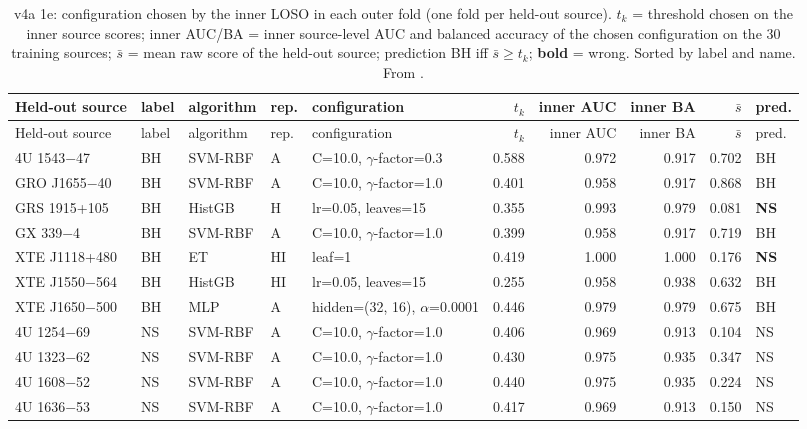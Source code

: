 {\scriptsize\setlength{\tabcolsep}{3pt}
\begin{longtable}{@{}llllp{3.6cm}rrrrl@{}}
\caption[v4a nested selection per fold]{v4a 1e: configuration chosen by the inner LOSO in each outer fold (one fold per
held-out source). $t_k$ = threshold chosen on the inner source scores; inner AUC/BA = inner source-level AUC and balanced
accuracy of the chosen configuration on the 30 training sources; $\bar s$ = mean raw score of the held-out source;
prediction BH iff $\bar s\ge t_k$; \textbf{bold} = wrong. Sorted by label and name. From
.}\label{tab:p2nested}\\
\toprule
Held-out source & label & algorithm & rep. & configuration & $t_k$ & inner AUC & inner BA & $\bar s$ & pred. \\
\midrule\endfirsthead
\toprule Held-out source & label & algorithm & rep. & configuration & $t_k$ & inner AUC & inner BA & $\bar s$ & pred. \\ \midrule\endhead
\bottomrule\endfoot
4U 1543$-$47 & BH & SVM-RBF & A & C=10.0, $\gamma$-factor=0.3 & 0.588 & 0.972 & 0.917 & 0.702 & BH \\
GRO J1655$-$40 & BH & SVM-RBF & A & C=10.0, $\gamma$-factor=1.0 & 0.401 & 0.958 & 0.917 & 0.868 & BH \\
GRS 1915+105 & BH & HistGB & H & lr=0.05, leaves=15 & 0.355 & 0.993 & 0.979 & 0.081 & \textbf{NS} \\
GX 339$-$4 & BH & SVM-RBF & A & C=10.0, $\gamma$-factor=1.0 & 0.399 & 0.958 & 0.917 & 0.719 & BH \\
XTE J1118+480 & BH & ET & HI & leaf=1 & 0.419 & 1.000 & 1.000 & 0.176 & \textbf{NS} \\
XTE J1550$-$564 & BH & HistGB & HI & lr=0.05, leaves=15 & 0.255 & 0.958 & 0.938 & 0.632 & BH \\
XTE J1650$-$500 & BH & MLP & A & hidden=(32, 16), $\alpha$=0.0001 & 0.446 & 0.979 & 0.979 & 0.675 & BH \\
4U 1254$-$69 & NS & SVM-RBF & A & C=10.0, $\gamma$-factor=1.0 & 0.406 & 0.969 & 0.913 & 0.104 & NS \\
4U 1323$-$62 & NS & SVM-RBF & A & C=10.0, $\gamma$-factor=1.0 & 0.430 & 0.975 & 0.935 & 0.347 & NS \\
4U 1608$-$52 & NS & SVM-RBF & A & C=10.0, $\gamma$-factor=1.0 & 0.440 & 0.975 & 0.935 & 0.224 & NS \\
4U 1636$-$53 & NS & SVM-RBF & A & C=10.0, $\gamma$-factor=1.0 & 0.417 & 0.969 & 0.913 & 0.150 & NS \\

\end{longtable}}
